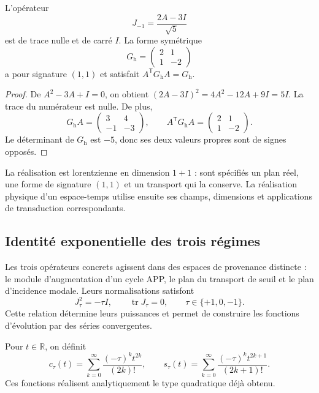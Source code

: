 \begin{proposicion}
\label{eul:prop:hiperbolico}
L'opérateur
\[
 J_{-1}=\frac{2A-3I}{\sqrt5}
\]
est de trace nulle et de carré \(I\). La forme symétrique
\[
 G_{\mathrm h}=\begin{pmatrix}2&1\\1&-2\end{pmatrix}
\]
a pour signature \((1,1)\) et satisfait
\(A^\mathsf TG_{\mathrm h}A=G_{\mathrm h}\).
\end{proposicion}
\begin{proof}
De \(A^2-3A+I=0\), on obtient
\((2A-3I)^2=4A^2-12A+9I=5I\). La trace du numérateur est nulle.
De plus,
\[
 G_{\mathrm h}A=\begin{pmatrix}3&4\\-1&-3\end{pmatrix},
 \qquad
 A^\mathsf TG_{\mathrm h}A
 =\begin{pmatrix}2&1\\1&-2\end{pmatrix}.
\]
Le déterminant de \(G_{\mathrm h}\) est \(-5\), donc ses deux
valeurs propres sont de signes opposés.
\end{proof}

La réalisation est lorentzienne en dimension \(1+1\) : sont spécifiés
un plan réel, une forme de signature \((1,1)\) et un transport qui la
conserve. La réalisation physique d’un espace-temps utilise ensuite
ses champs, dimensions et applications de transduction correspondants.

\subsection{Identité exponentielle des trois régimes}
\label{eul:identidad}

Les trois opérateurs concrets agissent dans des espaces de provenance distincte :
le module d’augmentation d’un cycle APP, le plan du transport de seuil
et le plan d’incidence modale. Leurs normalisations satisfont
\[
 J_\tau^2=-\tau I,\qquad \operatorname{tr}J_\tau=0,
 \qquad \tau\in\{+1,0,-1\}.
\]
Cette relation détermine leurs puissances et permet de construire les fonctions
d’évolution par des séries convergentes.

\begin{definicion}
Pour \(t\in\mathbb R\), on définit
\[
 c_\tau(t)=\sum_{k=0}^{\infty}
       \frac{(-\tau)^kt^{2k}}{(2k)!},\qquad
 s_\tau(t)=\sum_{k=0}^{\infty}
       \frac{(-\tau)^kt^{2k+1}}{(2k+1)!}.
\]
Ces fonctions réalisent analytiquement le type quadratique déjà obtenu.
\end{definicion}

